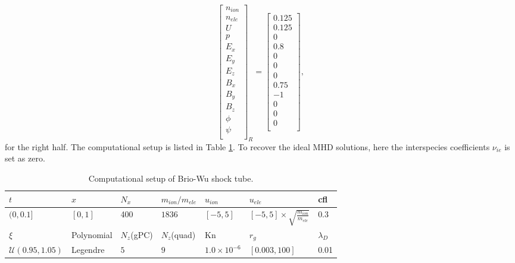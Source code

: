 \documentclass[preprint,3p,12pt,sort&compress]{elsarticle}
\begin{document}
\begin{equation*}
\left[\begin{array}{c}
n_{ion} \\
n_{ele} \\
U \\
p \\
E_x \\
E_y \\
E_z \\
B_x \\
B_y \\
B_z \\
\phi \\
\psi \\
\end{array}\right]_{{R}}=\left[\begin{array}{c}
0.125 \\
0.125  \\
0 \\
0.8 \\
0\\
0\\
0\\
0.75\\
-1\\
0\\
0\\
0\\
\end{array}\right],
\end{equation*}
for the right half.
The computational setup is listed in Table \ref{tab:briowu}.
To recover the ideal MHD solutions, here the interspecies coefficients $\nu_{ie}$ is set as zero.
\begin{table}[htbp]
	\caption{Computational setup of Brio-Wu shock tube.} 
	\centering
	\begin{tabular}{lllllll} 
		\toprule 
		$t$ & $x$ & $N_x$ & $m_{ion}/m_{ele}$ & $u_{ion}$ & $u_{ele}$ & cfl \\ 
		\midrule 
		$(0,0.1]$ & $[0,1]$ & 400 & $1836$ & $[-5,5]$ & $[-5,5]\times \sqrt{ \frac{m_{ion}}{m_{ele}} } $ & 0.3 \\ 
		\midrule 
		$\xi$ & Polynomial & $N_z$(gPC) & $N_z$(quad) & Kn & $r_g$ & $\lambda_D$ \\ 
		\midrule 
		$\mathcal U(0.95,1.05)$ & Legendre & $5$ & $9$ & $1.0 \times 10^{-6}$ & $[0.003,100]$  & 0.01   \\ 
		\bottomrule 
	\end{tabular} 
	\label{tab:briowu}
\end{table}
\end{document}

